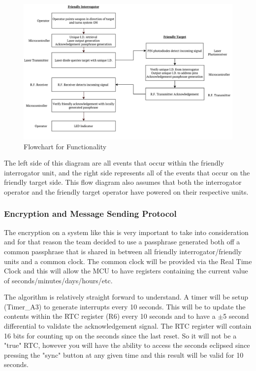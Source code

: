 \documentclass[letterpaper,10pt]{article}
\begin{document}
\begin{spacing}{1.15}
\begin{figure} [H]
	\centering
	\includegraphics[scale=0.55]{Functionality_Flowchart.pdf}
	\caption{Flowchart for Functionality\label{fig:circuit-schematic}}
\end{figure}

The left side of this diagram are all events that occur within the friendly interrogator unit, and the right side represents all of the events that occur on the friendly target side. This flow diagram also assumes that both the interrogator operator and the friendly target operator have powered on their respective units.

\subsubsection{Encryption and Message Sending Protocol}
The encryption on a system like this is very important to take into consideration and for that reason the team decided to use a passphrase generated both off a common passphrase that is shared in between all friendly interrogator/friendly units and a common clock. The common clock will be provided via the Real Time Clock and this will allow the MCU to have registers containing the current value of seconds/minutes/days/hours/etc. 

The algorithm is relatively straight forward to understand. A timer will be setup (Timer\_A3) to generate interrupts every 10 seconds. This will be to update the contents within the RTC register (R6) every 10 seconds and to have a $\pm$5 second differential to validate the acknowledgement signal. The RTC register will contain 16 bits for counting up on the seconds since the last reset. So it will not be a "true" RTC, however you will have the ability to access the seconds eclipsed since pressing the "sync" button at any given time and this result will be valid for 10 seconds.


\end{spacing}
\end{document}
